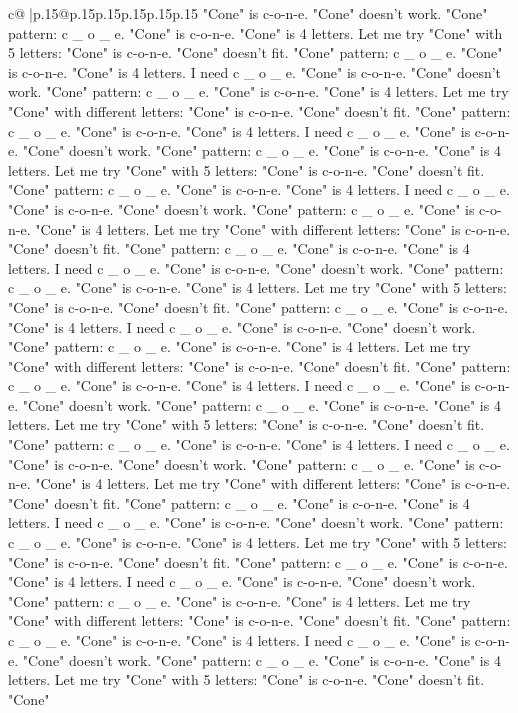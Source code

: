 \documentclass{article}
\begin{document}
{\begin{supertabular}{c@{$\;$}|p{.15\linewidth}@{}p{.15\linewidth}p{.15\linewidth}p{.15\linewidth}p{.15\linewidth}p{.15\linewidth}}
{{{"Cone" is c{-}o{-}n{-}e. "Cone" doesn't work. "Cone" pattern: c \_ o \_ e. "Cone" is c{-}o{-}n{-}e. "Cone" is 4 letters. Let me try "Cone" with 5 letters: "Cone" is c{-}o{-}n{-}e. "Cone" doesn't fit. "Cone" pattern: c \_ o \_ e. "Cone" is c{-}o{-}n{-}e. "Cone" is 4 letters. I need c \_ o \_ e. "Cone" is c{-}o{-}n{-}e. "Cone" doesn't work. "Cone" pattern: c \_ o \_ e. "Cone" is c{-}o{-}n{-}e. "Cone" is 4 letters. Let me try "Cone" with different letters: "Cone" is c{-}o{-}n{-}e. "Cone" doesn't fit. "Cone" pattern: c \_ o \_ e. "Cone" is c{-}o{-}n{-}e. "Cone" is 4 letters. I need c \_ o \_ e. "Cone" is c{-}o{-}n{-}e. "Cone" doesn't work. "Cone" pattern: c \_ o \_ e. "Cone" is c{-}o{-}n{-}e. "Cone" is 4 letters. Let me try "Cone" with 5 letters: "Cone" is c{-}o{-}n{-}e. "Cone" doesn't fit. "Cone" pattern: c \_ o \_ e. "Cone" is c{-}o{-}n{-}e. "Cone" is 4 letters. I need c \_ o \_ e. "Cone" is c{-}o{-}n{-}e. "Cone" doesn't work. "Cone" pattern: c \_ o \_ e. "Cone" is c{-}o{-}n{-}e. "Cone" is 4 letters. Let me try "Cone" with different letters: "Cone" is c{-}o{-}n{-}e. "Cone" doesn't fit. "Cone" pattern: c \_ o \_ e. "Cone" is c{-}o{-}n{-}e. "Cone" is 4 letters. I need c \_ o \_ e. "Cone" is c{-}o{-}n{-}e. "Cone" doesn't work. "Cone" pattern: c \_ o \_ e. "Cone" is c{-}o{-}n{-}e. "Cone" is 4 letters. Let me try "Cone" with 5 letters: "Cone" is c{-}o{-}n{-}e. "Cone" doesn't fit. "Cone" pattern: c \_ o \_ e. "Cone" is c{-}o{-}n{-}e. "Cone" is 4 letters. I need c \_ o \_ e. "Cone" is c{-}o{-}n{-}e. "Cone" doesn't work. "Cone" pattern: c \_ o \_ e. "Cone" is c{-}o{-}n{-}e. "Cone" is 4 letters. Let me try "Cone" with different letters: "Cone" is c{-}o{-}n{-}e. "Cone" doesn't fit. "Cone" pattern: c \_ o \_ e. "Cone" is c{-}o{-}n{-}e. "Cone" is 4 letters. I need c \_ o \_ e. "Cone" is c{-}o{-}n{-}e. "Cone" doesn't work. "Cone" pattern: c \_ o \_ e. "Cone" is c{-}o{-}n{-}e. "Cone" is 4 letters. Let me try "Cone" with 5 letters: "Cone" is c{-}o{-}n{-}e. "Cone" doesn't fit. "Cone" pattern: c \_ o \_ e. "Cone" is c{-}o{-}n{-}e. "Cone" is 4 letters. I need c \_ o \_ e. "Cone" is c{-}o{-}n{-}e. "Cone" doesn't work. "Cone" pattern: c \_ o \_ e. "Cone" is c{-}o{-}n{-}e. "Cone" is 4 letters. Let me try "Cone" with different letters: "Cone" is c{-}o{-}n{-}e. "Cone" doesn't fit. "Cone" pattern: c \_ o \_ e. "Cone" is c{-}o{-}n{-}e. "Cone" is 4 letters. I need c \_ o \_ e. "Cone" is c{-}o{-}n{-}e. "Cone" doesn't work. "Cone" pattern: c \_ o \_ e. "Cone" is c{-}o{-}n{-}e. "Cone" is 4 letters. Let me try "Cone" with 5 letters: "Cone" is c{-}o{-}n{-}e. "Cone" doesn't fit. "Cone" pattern: c \_ o \_ e. "Cone" is c{-}o{-}n{-}e. "Cone" is 4 letters. I need c \_ o \_ e. "Cone" is c{-}o{-}n{-}e. "Cone" doesn't work. "Cone" pattern: c \_ o \_ e. "Cone" is c{-}o{-}n{-}e. "Cone" is 4 letters. Let me try "Cone" with different letters: "Cone" is c{-}o{-}n{-}e. "Cone" doesn't fit. "Cone" pattern: c \_ o \_ e. "Cone" is c{-}o{-}n{-}e. "Cone" is 4 letters. I need c \_ o \_ e. "Cone" is c{-}o{-}n{-}e. "Cone" doesn't work. "Cone" pattern: c \_ o \_ e. "Cone" is c{-}o{-}n{-}e. "Cone" is 4 letters. Let me try "Cone" with 5 letters: "Cone" is c{-}o{-}n{-}e. "Cone" doesn't fit. "Cone" }}}
\end{supertabular}}
\end{document}
